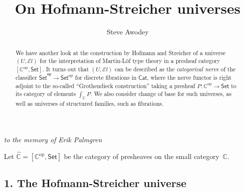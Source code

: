 \documentclass[11pt]{article}
\newcommand{\C}{\ensuremath{\mathbb{C}}}
\newcommand{\op}[1]{\ensuremath{{#1}^{\mathrm{op}}}}
\newcommand{\psh}[1]{\ensuremath{[\op{#1},\mathsf{Set}]}}
\newcommand{\Set}{\ensuremath{\mathsf{Set}}}
\newcommand{\Cat}{\ensuremath{\mathsf{Cat}}}
\newcommand{\El}{\ensuremath{\mathcal{E}l}}%
\renewcommand{\to}{\ensuremath{\rightarrow}}
\theoremstyle{remark}
\theoremstyle{definition}
\begin{document}

\title{On Hofmann-Streicher universes}
\author{Steve Awodey}
\maketitle

\centerline{\emph{to the memory of Erik Palmgren}}

\medskip

\begin{abstract}
We have another look at the construction by Hofmann and Streicher of a universe $(U,\El)$ for the interpretation of Martin-L\"of type theory in a presheaf category $\psh{\C}$.  It turns out that $(U,\El)$ can be described as the \emph{categorical nerve} of the classifier $\dot{\Set}^{\mathsf{op}} \to \op{\Set}$ for discrete fibrations in $\Cat$, where the nerve functor is right adjoint to the so-called ``Grothendieck construction'' taking a presheaf $P : \op{\C}\to\Set$ to its category of elements $\int_\C P$.  We also consider change of base for such universes, as well as universes of structured families, such as fibrations.
\end{abstract}



\noindent Let $\widehat{\C} = \psh{\C}$ be the category of presheaves on the small category~$\C$.

\subsection*{1. The Hofmann-Streicher universe}\label{sec:U}
\end{document}
